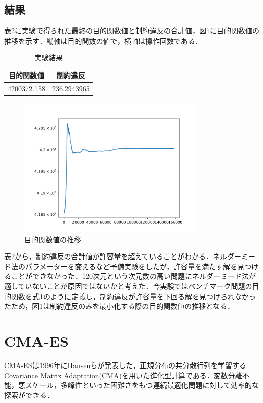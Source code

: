 \documentclass[twocolumn]{jarticle}
\begin{document}
	\subsection{結果}
		表2に実験で得られた最終の目的関数値と制約違反の合計値，図1に目的関数値の推移を示す．縦軸は目的関数の値で，横軸は操作回数である．
		\begin{table}[htbp]
			\begin{center}
				\caption{実験結果}
				\begin{tabular}{| c | c |} \hline
					目的関数値 & 制約違反 \\ \hline 
					4200372.158 &  236.2943965 \\ \hline
				\end{tabular}
			\end{center}
		\end{table}
		\begin{figure}
			\centering
            \includegraphics[width=9cm]{nelder.pdf}
            \caption{目的関数値の推移}
        \end{figure}

	表2から，制約違反の合計値が許容量を超えていることがわかる．ネルダーミード法のパラメーターを変えるなど予備実験をしたが，許容量を満たす解を見つけることができなかった．120次元という次元数の高い問題にネルダーミード法が適していないことが原因ではないかと考えた．今実験ではベンチマーク問題の目的関数を式1のように定義し，制約違反が許容量を下回る解を見つけられなかったため，図1は制約違反のみを最小化する際の目的関数値の推移となる．


\section{CMA-ES}
CMA-ES\cite{542381}は1996年にHansenらが発表した，正規分布の共分散行列を学習するCovariance Matrix Adaptation(CMA)を用いた進化型計算である．変数分離不能，悪スケール，多峰性といった困難さをもつ連続最適化問題に対して効率的な探索ができる．
\end{document}
